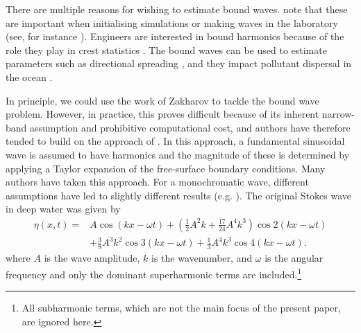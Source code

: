 \documentclass[lineno]{JFM-FLM_Au}
\begin{document}
There are multiple reasons for wishing to estimate bound waves. \cite{madsen2012third} note that these are important when initialising simulations or making waves in the laboratory (see, for instance \cite{orszaghova2014importance}). Engineers are interested in bound harmonics because of the role they play in crest statistics \citep{forristall2000wave}. The bound waves can be used to estimate parameters such as directional spreading \citep{adcock2009estimating}, and they impact pollutant dispersal in the ocean \citep{van2015estimates}.

In principle, we could use the work of Zakharov to tackle the bound wave problem. However, in practice, this proves difficult because of its inherent narrow-band assumption and prohibitive computational cost, and authors have therefore tended to build on the approach of \cite{stokes1847theory}. In this approach, a fundamental sinusoidal wave is assumed to have harmonics and the magnitude of these is determined by applying a Taylor expansion of the free-surface boundary conditions. Many authors have taken this approach. For a monochromatic wave, different assumptions have led to slightly different results (e.g. \cite{fenton1985fifth,zhao2022stokes,fang_theory_2023}). The original Stokes wave in deep water was given by
\begin{equation}
\begin{aligned}
\eta(x, t)= & A \cos (k x-\omega t)+\left(\frac{1}{2} A^2 k+\frac{17}{24} A^4 k^3\right) \cos 2(k x-\omega t) \\
& +\frac{3}{8} A^3 k^2 \cos 3(k x-\omega t)+\frac{1}{3} A^4 k^3 \cos 4(k x-\omega t).
\end{aligned}
\end{equation}
where $A$ is the wave amplitude, $k$ is the wavenumber, and $\omega$ is the angular frequency and only the dominant superharmonic terms are included.\footnote{All subharmonic terms, which are not the main focus of the present paper, are ignored here.}
\end{document}
